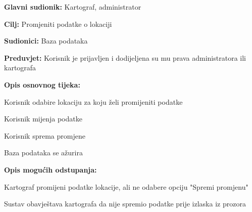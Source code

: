 				
					\noindent {}
					\begin{packed_item}
						
						\item \textbf{Glavni sudionik: }Kartograf, administrator
						\item  \textbf{Cilj:} Promjeniti podatke o lokaciji
						\item  \textbf{Sudionici:} Baza podataka
						\item  \textbf{Preduvjet:} Korisnik je prijavljen i dodijeljena su mu prava administratora ili kartografa
						\item  \textbf{Opis osnovnog tijeka:}
						
						\item[] \begin{packed_enum}
							
							\item Korisnik odabire lokaciju za koju želi promijeniti podatke
							\item Korisnik mijenja podatke
							\item Korisnik sprema promjene
							\item Baza podataka se ažurira
						\end{packed_enum}
						
						\item  \textbf{Opis mogućih odstupanja:}
						
						\item[] \begin{packed_item}
							
							\item Kartograf promijeni podatke lokacije, ali ne odabere opciju "Spremi promjenu"
							\item[] \begin{packed_enum}
								\item Sustav obavještava kartografa da nije spremio podatke prije izlaska iz prozora
							\end{packed_enum}
						\end{packed_item}
					\end{packed_item}
				
